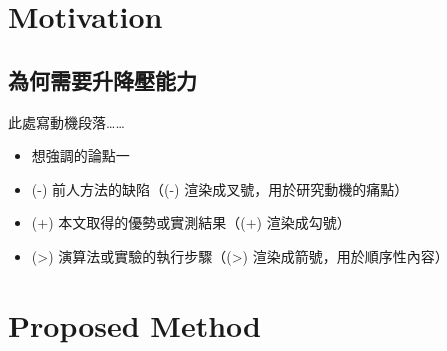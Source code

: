 \documentclass{article}
\begin{document}
\section{Motivation}
\subsection{為何需要升降壓能力}
此處寫動機段落……

\begin{itemize}
\item 想強調的論點一
\item (-) 前人方法的缺陷（(-) 渲染成叉號，用於研究動機的痛點）
\item (+) 本文取得的優勢或實測結果（(+) 渲染成勾號）
\item (>) 演算法或實驗的執行步驟（(>) 渲染成箭號，用於順序性內容）
\end{itemize}

\section{Proposed Method}
\end{document}
